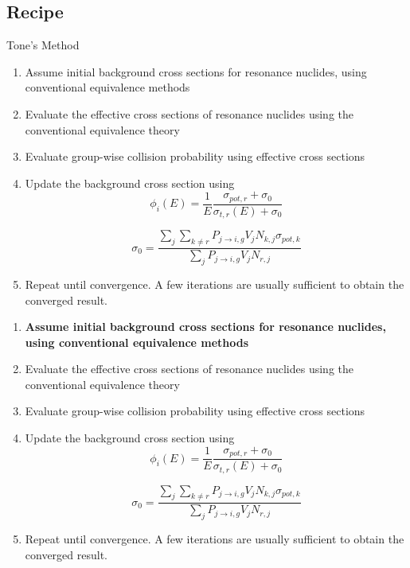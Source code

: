 \documentclass{beamer}
\begin{document}
\subsection{Recipe}
    \begin{frame}{Tone's Method}
      \begin{enumerate}
        \item Assume initial background cross sections for resonance nuclides, using conventional equivalence methods
        \item Evaluate the effective cross sections of resonance nuclides using the conventional equivalence theory
        \item Evaluate group-wise collision probability using effective cross sections 
        \item Update the background cross section using
\begin{equation*}\phi_i(E)=\frac{1}{E}\frac{\sigma_{pot,r}+\sigma_{0}}{\sigma_{t,r}(E)+\sigma_{0}}\end{equation*}

\begin{equation*}\sigma_{0}=\frac{\sum\limits_j\sum\limits_{k\neq r}P_{j\rightarrow i,g}V_{j}N_{k,j}\sigma_{pot,k}}{\sum\limits_jP_{j\rightarrow i,g}V_{j}N_{r,j}}\end{equation*}


        \item Repeat until convergence. A few iterations are usually sufficient to obtain the converged result.
      \end{enumerate}
\end{frame}

    \begin{frame}
      \begin{enumerate}
        \item \textbf{Assume initial background cross sections for resonance nuclides, using conventional equivalence methods}
        \item Evaluate the effective cross sections of resonance nuclides using the conventional equivalence theory
        \item Evaluate group-wise collision probability using effective cross sections 
        \item Update the background cross section using
\begin{equation*}\phi_i(E)=\frac{1}{E}\frac{\sigma_{pot,r}+\sigma_{0}}{\sigma_{t,r}(E)+\sigma_{0}}\end{equation*}

\begin{equation*}\sigma_{0}=\frac{\sum\limits_j\sum\limits_{k\neq r}P_{j\rightarrow i,g}V_{j}N_{k,j}\sigma_{pot,k}}{\sum\limits_jP_{j\rightarrow i,g}V_{j}N_{r,j}}\end{equation*}


        \item Repeat until convergence. A few iterations are usually sufficient to obtain the converged result.
      \end{enumerate}
\end{frame}
\end{document}
